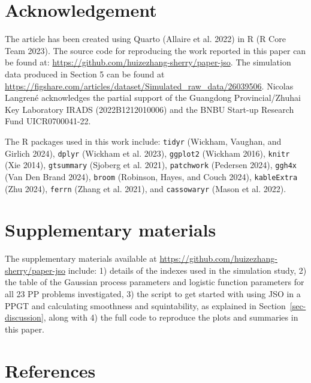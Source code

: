 \documentclass[
  12pt,
]{interact}
\theoremstyle{plain}
\begin{document}
\section{Acknowledgement}\label{acknowledgement}

The article has been created using Quarto (Allaire et al. 2022) in R (R
Core Team 2023). The source code for reproducing the work reported in
this paper can be found at:
\url{https://github.com/huizezhang-sherry/paper-jso}. The simulation
data produced in Section 5 can be found at
\url{https://figshare.com/articles/dataset/Simulated_raw_data/26039506}.
Nicolas Langrené acknowledges the partial support of the Guangdong
Provincial/Zhuhai Key Laboratory IRADS (2022B1212010006) and the BNBU
Start-up Research Fund UICR0700041-22.

The R packages used in this work include: \texttt{tidyr} (Wickham,
Vaughan, and Girlich 2024), \texttt{dplyr} (Wickham et al. 2023),
\texttt{ggplot2} (Wickham 2016), \texttt{knitr} (Xie 2014),
\texttt{gtsummary} (Sjoberg et al. 2021), \texttt{patchwork} (Pedersen
2024), \texttt{ggh4x} (Van Den Brand 2024), \texttt{broom} (Robinson,
Hayes, and Couch 2024), \texttt{kableExtra} (Zhu 2024), \texttt{ferrn}
(Zhang et al. 2021), and \texttt{cassowaryr} (Mason et al. 2022).

\section*{Supplementary materials}\label{supplementary-materials}

The supplementary materials available at
\url{https://github.com/huizezhang-sherry/paper-jso} include: 1) details
of the indexes used in the simulation study, 2) the table of the
Gaussian process parameters and logistic function parameters for all 23
PP problems investigated, 3) the script to get started with using JSO in
a PPGT and calculating smoothness and squintability, as explained in
Section~\ref{sec-discussion}, along with 4) the full code to reproduce
the plots and summaries in this paper.

\section*{References}\label{references}
\end{document}
